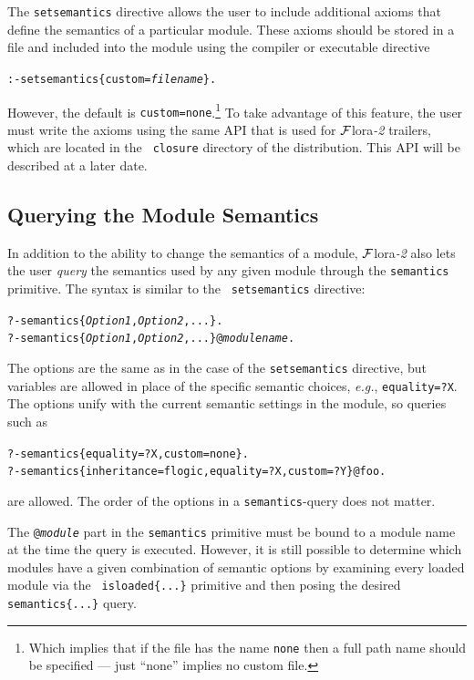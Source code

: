 \documentclass[11pt]{article}
\newcommand{\FLORA}{{\mbox{\sc ${\cal F}${lora}\rm\emph{-2}}}\xspace}
\newcommand{\FLSYSTEM}{\FLORA}
\begin{document}
The {\tt setsemantics} directive allows the user to include additional axioms
that define the semantics of a particular module. These axioms should be
stored in a file and included into the module using the compiler or
executable directive
\begin{alltt}
   :- setsemantics\{custom=\emph{filename}\}.  
\end{alltt}
However, the default is  {\tt custom=none}.\footnote{
  Which implies that if the file has the name {\tt none} then a full path
  name should be specified --- just ``none'' implies no custom file.
}
To take advantage of this feature, the user must write the axioms using the
same API that is used for \FLSYSTEM trailers, which are located in the {\tt
  closure} directory of the distribution. This API will be described at a
later date.

\subsection{Querying the Module Semantics}\label{sec-query-semantics}

In addition to the ability to change the semantics of a module, \FLSYSTEM also
lets the user \emph{query} the semantics used by any given module through
the {\tt semantics} primitive. The syntax is similar to the {\tt
  setsemantics} directive:
\begin{alltt}
   ?- semantics\{{\em Option1}, {\em Option2}, ...\}. 
   ?- semantics\{{\em Option1}, {\em Option2}, ...\}@\emph{modulename}.
\end{alltt}
The options are the same as in the case of the {\tt setsemantics}
directive, but variables are allowed in place of the specific semantic
choices, {\it e.g.}, {\tt equality=?X}. The options unify with the current
semantic settings in the module, so queries such as 
\begin{alltt}
   ?- semantics\{equality=?X, custom=none\}.
   ?- semantics\{inheritance=flogic, equality=?X, custom=?Y\}@foo.
\end{alltt}
are allowed. The order of the options in a {\tt semantics}-query does not
matter.

The {\tt @\emph{module}} part in the {\tt semantics} primitive must be
bound to a module name at the time the query is executed. However, it is
still possible to determine which modules have a given combination of
semantic options by examining every loaded module via the {\tt
  isloaded\{...\}} primitive and then posing the desired {\tt
  semantics\{...\}} query.
\end{document}
